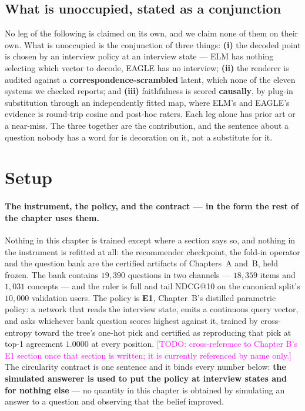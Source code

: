 \documentclass[11pt]{article}
\newcommand{\todo}[1]{\textcolor{magenta}{[TODO: #1]}}
\begin{document}
\subsection{What is unoccupied, stated as a conjunction}

No leg of the following is claimed on its own, and we claim none of them on their own. What is
unoccupied is the conjunction of three things: \textbf{(i)} the decoded point is chosen by an
interview policy at an interview state --- ELM has nothing selecting which vector to decode, EAGLE has
no interview; \textbf{(ii)} the renderer is audited against a \textbf{correspondence-scrambled}
latent, which none of the eleven systems we checked reports; and \textbf{(iii)} faithfulness is
scored \textbf{causally}, by plug-in substitution through an independently fitted map, where ELM's
and EAGLE's evidence is round-trip cosine and post-hoc raters. Each leg alone has prior art or a
near-miss. The three together are the contribution, and the sentence about a question nobody has a
word for is decoration on it, not a substitute for it.

\section{Setup}
\label{sec:setup}

\paragraph{The instrument, the policy, and the contract --- in the form the rest of the chapter uses
them.} Nothing in this chapter is trained except where a section says so, and nothing in the
instrument is refitted at all: the recommender checkpoint, the fold-in operator and the question bank
are the certified artifacts of Chapters~A and~B, held frozen. The bank contains $19{,}390$ questions
in two channels --- $18{,}359$ items and $1{,}031$ concepts --- and the ruler is full and tail NDCG@10
on the canonical split's $10{,}000$ validation users. The policy is \textbf{E1}, Chapter~B's distilled
parametric policy: a network that reads the interview state, emits a continuous query vector, and asks
whichever bank question scores highest against it, trained by cross-entropy toward the tree's one-hot
pick and certified as reproducing that pick at top-1 agreement $1.0000$ at every position.
\todo{cross-reference to Chapter B's E1 section once that section is written; it is currently
referenced by name only.} The circularity contract is one sentence and it binds every number below:
\textbf{the simulated answerer is used to put the policy at interview states and for nothing else} ---
no quantity in this chapter is obtained by simulating an answer to a question and observing that the
belief improved.
\end{document}
